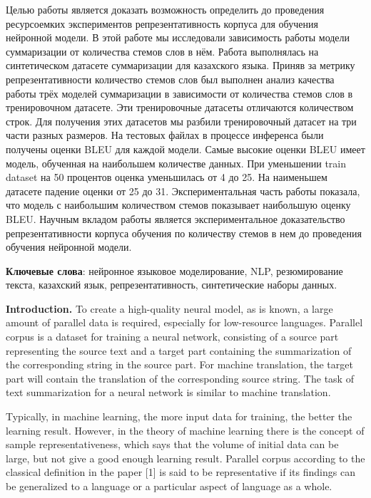Целью работы является доказать возможность определить до проведения
ресурсоемких экспериментов репрезентативность корпуса для обучения
нейронной модели. В этой работе мы исследовали зависимость работы модели
суммаризации от количества стемов слов в нём. Работа выполнялась на
синтетическом датасете суммаризации для казахского языка. Приняв за
метрику репрезентативности количество стемов слов был выполнен анализ
качества работы трёх моделей суммаризации в зависимости от количества
стемов слов в тренировочном датасете. Эти тренировочные датасеты
отличаются количеством строк. Для получения этих датасетов мы разбили
тренировочный датасет на три части разных размеров. На тестовых файлах в
процессе инференса были получены оценки BLEU для каждой модели. Самые
высокие оценки BLEU имеет модель, обученная на наибольшем количестве
данных. При уменьшении train dataset на 50 процентов оценка уменьшилась
от 4 до 25. На наименьшем датасете падение оценки от 25 до 31.
Экспериментальная часть работы показала, что модель с наибольшим
количеством стемов показывает наибольшую оценку BLEU. Научным вкладом
работы является экспериментальное доказательство репрезентативности
корпуса обучения по количеству стемов в нем до проведения обучения
нейронной модели.

\textbf{Ключевые слова}: нейронное языковое моделирование, NLP,
резюмирование текста, казахский язык, репрезентативность, синтетические
наборы данных.

\textbf{Introduction.} To create a high-quality neural model, as is
known, a large amount of parallel data is required, especially for
low-resource languages. Parallel corpus is a dataset for training a
neural network, consisting of a source part representing the source text
and a target part containing the summarization of the corresponding
string in the source part. For machine translation, the target part will
contain the translation of the corresponding source string. The task of
text summarization for a neural network is similar to machine
translation.

Typically, in machine learning, the more input data for training, the
better the learning result. However, in the theory of machine learning
there is the concept of sample representativeness, which says that the
volume of initial data can be large, but not give a good enough learning
result. Parallel corpus according to the classical definition in the
paper {[}1{]} is said to be representative if its findings can be
generalized to a language or a particular aspect of language as a whole.

